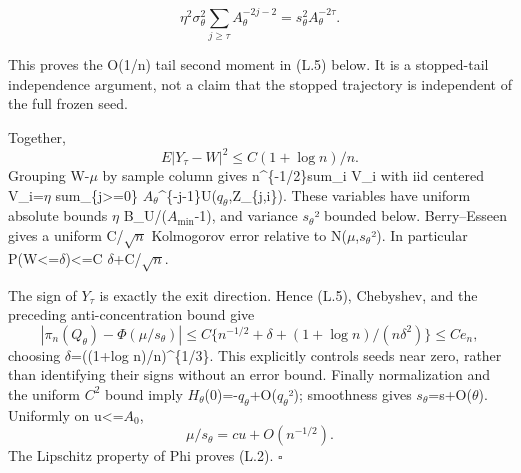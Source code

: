 \[
\eta^2\sigma_\theta^2\sum_{j\ge\tau}A_\theta^{-2j-2}
=s_\theta^2 A_\theta^{-2\tau}.
\]

This proves the O(1/n) tail second moment in (L.5) below. It is a stopped-tail independence argument, not a claim that the stopped trajectory is independent of the full frozen seed.

Together,
\[
E|Y_\tau-W|^2\le C(1+\log n)/n.
\tag{L.5}
\]
Grouping W-\(\mu\) by sample column gives n\^{}\{-1/2\}sum\_i V\_i with iid centered
V\_i=\(\eta\) sum\_\{j\textgreater=0\} \(A_\theta\)\^{}\{-j-1\}U(\(q_\theta\),Z\_\{j,i\}). These variables have uniform absolute bounds \(\eta\) B\_U/(\(A_{\min}\)-1), and variance \(s_\theta\)² bounded below. Berry--Esseen gives a uniform C/\(\sqrt n\) Kolmogorov error relative to N(\(\mu\),\(s_\theta\)²). In particular P(\textbar W\textbar\textless=\(\delta\))\textless=C \(\delta\)+C/\(\sqrt n\).

The sign of \(Y_\tau\) is exactly the exit direction. Hence (L.5), Chebyshev, and the preceding anti-concentration bound give
\[
|\pi_n(Q_\theta)-\Phi(\mu/s_\theta)|
\le C\{n^{-1/2}+\delta+(1+\log n)/(n\delta^2)\}\le C e_n,
\]
choosing \(\delta\)=((1+log n)/n)\^{}\{1/3\}. This explicitly controls seeds near zero, rather than identifying their signs without an error bound. Finally normalization and the uniform \(C^2\) bound imply \(H_\theta\)(0)=-\(q_\theta\)+O(\(q_\theta\)²); smoothness gives \(s_\theta\)=s+O(\textbar{}\(\theta\)\textbar). Uniformly on \textbar u\textbar\textless=\(A_0\),
\[
\mu/s_\theta=cu+O(n^{-1/2}).
\]
The Lipschitz property of Phi proves (L.2). \(\square\)
